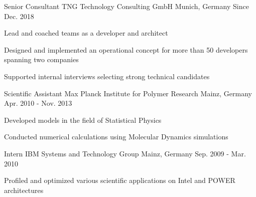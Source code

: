 

\begin{cventries}

  \cventry
    {Senior Consultant}
    {TNG Technology Consulting GmbH}
    {Munich, Germany}
    {Since Dec. 2018}
    {
      \begin{cvitems}
        \item{Lead and coached teams as a developer and architect}
        \item{Designed and implemented an operational concept for more than 50 developers spanning two companies}
        \item{Supported internal interviews selecting strong technical candidates}
      \end{cvitems}
    }

  \cventry
    {Scientific Assistant}
    {Max Planck Institute for Polymer Research}
    {Mainz, Germany}
    {Apr. 2010 - Nov. 2013}
    {
      \begin{cvitems}
        \item {Developed models in the field of Statistical Physics}
        \item {Conducted numerical calculations using Molecular Dynamics simulations}
      \end{cvitems}
    }


  \cventry
    {Intern}
    {IBM Systems and Technology Group}
    {Mainz, Germany}
    {Sep. 2009 - Mar. 2010}
    {
      \begin{cvitems}
        \item {Profiled and optimized various scientific applications on Intel and POWER architectures}
      \end{cvitems}
    }

\end{cventries}
